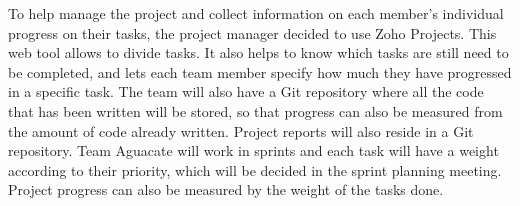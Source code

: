
To help manage the project and collect information on each member's individual
progress on their tasks, the project manager decided to use Zoho Projects. This
web tool allows to divide tasks. It also helps to know which tasks are still
need to be completed, and lets each team member specify how much they have
progressed in a specific task. The team will also have a Git repository where
all the code that has been written will be stored, so that progress can also be
measured from the amount of code already written. Project reports will also
reside in a Git repository. Team Aguacate will work in sprints and each task will
have a weight according to their priority, which will be decided in the sprint
planning meeting. Project progress can also be measured by the weight of the
tasks done.
